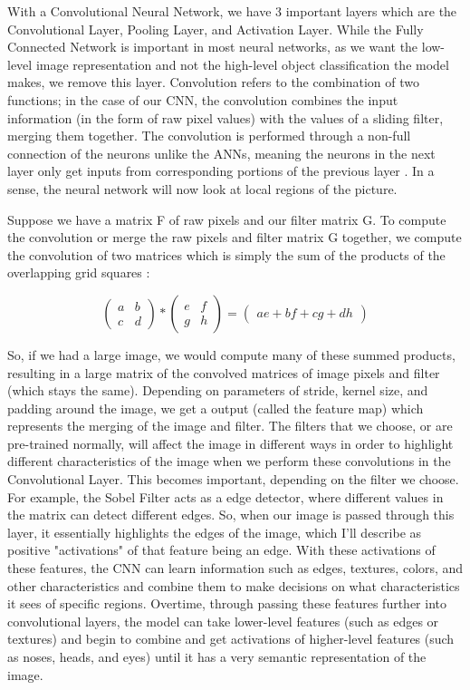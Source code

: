 \documentclass[10pt,twocolumn]{article}
\begin{document}
With a Convolutional Neural Network, we have 3 important layers which are the Convolutional Layer, Pooling Layer, and Activation Layer. While the Fully Connected Network is important in most neural networks, as we want the low-level image representation and not the high-level object classification the model makes, we remove this layer. Convolution refers to the combination of two functions; in the case of our CNN, the convolution combines the input information (in the form of raw pixel values) with the values of a sliding filter, merging them together. The convolution is performed through a non-full connection of the neurons unlike the ANNs, meaning the neurons in the next layer only get inputs from corresponding portions of the previous layer \cite{Albawi2017}. In a sense, the neural network will now look at local regions of the picture.

Suppose we have a matrix F of raw pixels and our filter matrix G. To compute the convolution or merge the raw pixels and filter matrix G together, we compute the convolution of two matrices which is simply the sum of the products of the overlapping grid squares \cite{Dumoulin2018}:

$$ \begin{pmatrix} a & b \\ c & d \end{pmatrix} * \begin{pmatrix} e & f \\ g & h \end{pmatrix} = \begin{pmatrix} ae + bf + cg + dh \end{pmatrix} $$ 

So, if we had a large image, we would compute many of these summed products, resulting in a large matrix of the convolved matrices of image pixels and filter (which stays the same). Depending on parameters of stride, kernel size, and padding around the image, we get a output (called the feature map) which represents the merging of the image and filter. The filters that we choose, or are pre-trained normally, will affect the image in different ways in order to highlight different characteristics of the image when we perform these convolutions in the Convolutional Layer. This becomes important, depending on the filter we choose. For example, the Sobel Filter \cite{Bogdan2019} acts as a edge detector, where different values in the matrix can detect different edges. So, when our image is passed through this layer, it essentially highlights the edges of the image, which I'll describe as positive "activations" of that feature being an edge. With these activations of these features, the CNN can learn information such as edges, textures, colors, and other characteristics and combine them to make decisions on what characteristics it sees of specific regions. Overtime, through passing these features further into convolutional layers, the model can take lower-level features (such as edges or textures) and begin to combine and get activations of higher-level features (such as noses, heads, and eyes) until it has a very semantic representation of the image.
\end{document}

